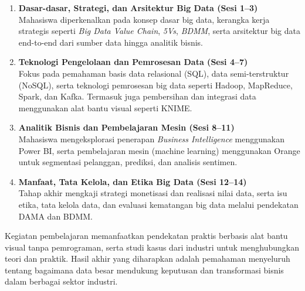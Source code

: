 \begin{enumerate}
	\item \textbf{Dasar-dasar, Strategi, dan Arsitektur Big Data (Sesi 1--3)} \\
	Mahasiswa diperkenalkan pada konsep dasar big data, kerangka kerja strategis seperti \textit{Big Data Value Chain}, \textit{5Vs}, \textit{BDMM}, serta arsitektur big data end-to-end dari sumber data hingga analitik bisnis.
	
	\item \textbf{Teknologi Pengelolaan dan Pemrosesan Data (Sesi 4--7)} \\
	Fokus pada pemahaman basis data relasional (SQL), data semi-terstruktur (NoSQL), serta teknologi pemrosesan big data seperti Hadoop, MapReduce, Spark, dan Kafka. Termasuk juga pembersihan dan integrasi data menggunakan alat bantu visual seperti KNIME.
	
	\item \textbf{Analitik Bisnis dan Pembelajaran Mesin (Sesi 8--11)} \\
	Mahasiswa mengeksplorasi penerapan \textit{Business Intelligence} menggunakan Power BI, serta pembelajaran mesin (machine learning) menggunakan Orange untuk segmentasi pelanggan, prediksi, dan analisis sentimen.
	
	\item \textbf{Manfaat, Tata Kelola, dan Etika Big Data (Sesi 12--14)} \\
	Tahap akhir mengkaji strategi monetisasi dan realisasi nilai data, serta isu etika, tata kelola data, dan evaluasi kematangan big data melalui pendekatan DAMA dan BDMM.
\end{enumerate}

Kegiatan pembelajaran memanfaatkan pendekatan praktis berbasis alat bantu visual tanpa pemrograman, serta studi kasus dari industri untuk menghubungkan teori dan praktik. Hasil akhir yang diharapkan adalah pemahaman menyeluruh tentang bagaimana data besar mendukung keputusan dan transformasi bisnis dalam berbagai sektor industri.

